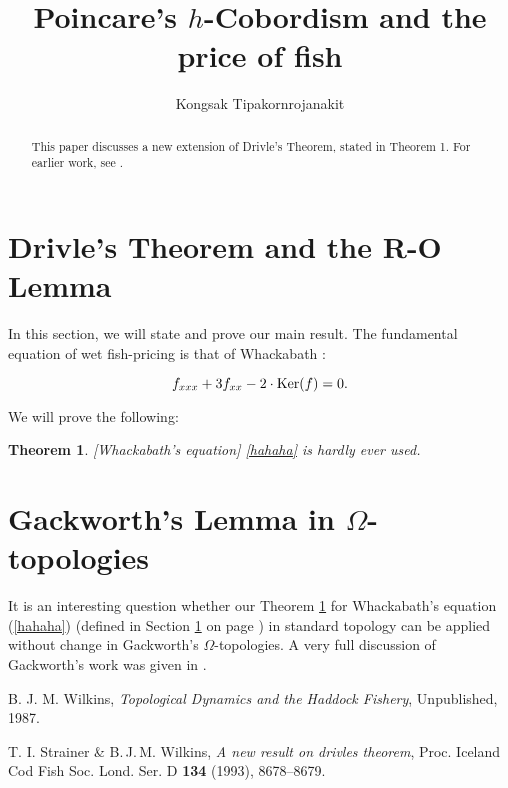 \documentclass[12pt, a4paper]{article}
\newtheorem{theorem}{Theorem}
\begin{document}
 	\title{Poincare's $h$-Cobordism and the price of fish}
 	\author{Kongsak Tipakornrojanakit}
 	\maketitle
 	
 	\vspace{0.2in}
 	
 	\tableofcontents
 	
 	\vspace{0.4in}
 	
 	
 	\begin{abstract}
 		This paper discusses a new extension of Drivle's Theorem, stated in Theorem 1. For earlier work, see \cite{sw, bjm}.
 	\end{abstract}
 	
 	\section{Drivle's Theorem and the R-O Lemma} \label{DrivleThe}
 	In this section, we will state and prove our main result. The fundamental equation of wet fish-pricing is that of Whackabath \cite{sw}:
 	
		\begin{equation}\label{hahaha}
		f_{xxx} + 3f_{xx} - 2 \cdot  \textnormal{Ker}(f) = 0.
		\end{equation}
		
 	\noindent We will prove the following:
 	
 	\begin{theorem} \label{the1}
 	[Whackabath's equation]{ \eqref{hahaha} is hardly ever used.}
	\end{theorem}
	
 	\section{Gackworth's Lemma in $\Omega$-topologies}
	It is an interesting question whether our Theorem \ref{the1} for Whackabath's equation (\ref{hahaha}) (defined in Section \ref{DrivleThe} on page \pageref{DrivleThe}) in standard topology can be applied without change in Gackworth's $\Omega$-topologies. A very full discussion of Gackworth's work was given in \cite{bjm}.

 	\begin{thebibliography}{9}
 	B. J. M. Wilkins,
 	\emph{Topological Dynamics and the Haddock Fishery},
 	Unpublished, 1987.

 	T. I. Strainer \& B.\,J.\,M. Wilkins,
 	\emph{A new result on drivles theorem},
 	Proc. Iceland Cod Fish Soc. Lond. Ser. D \textbf{134} (1993), 8678--8679.
 	\end{thebibliography}
 	
 	
 	
\end{document}
